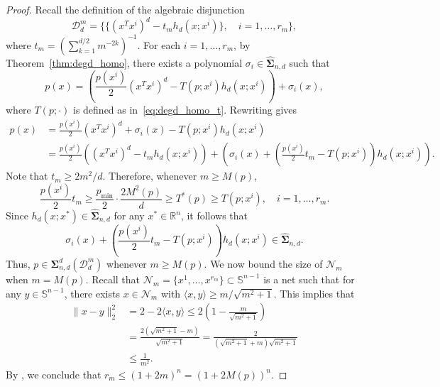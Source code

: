 \documentclass[12pt]{article}
\newcommand{\reals}{\mathbb{R}}
\newcommand{\HSOS}{\widehat{\mathbf{\Sigma}}}
\newcommand{\DiSOS}{\mathbf{\Sigma}}
\newcommand{\mcN}{\mathcal{N}}
\newcommand{\mbS}{\mathbb{S}}
\newcommand{\mcD}{\mathcal{D}}
\theoremstyle{remark}
\begin{document}
\begin{proof}
Recall the definition of the algebraic disjunction
\[
 \mcD_d^{m}=\big\{\{(x^Tx^i)^{d}-t_mh_{d}(x;x^i)\},\quad i=1,\ldots,r_m\big\},   
\]
where $t_m=\left(\sum_{k=1}^{d/2}m^{-2k}\right)^{-1}$. For each $i=1,\ldots,r_m$, by Theorem~\ref{thm:degd_homo}, there exists a polynomial $\sigma_i\in\HSOS_{n,d}$ such that
 \[    p(x)=\left(\frac{p(x^i)}{2}(x^Tx^i)^d-T(p;x^i)h_d(x;x^i)\right)+\sigma_i(x),\]
 where $T(p;\cdot)$ is defined as in~\eqref{eq:degd_homo_t}. 
Rewriting gives
  \[\begin{aligned}    
  p(x)&=\frac{p(x^i)}{2}(x^Tx^i)^d+\sigma_i(x)-T(p;x^i)h_d(x;x^i)\\
  &=\frac{p(x^i)}{2}\left((x^Tx^i)^d-t_mh_d(x;x^i)\right)+\left(\sigma_i(x)+\left(\frac{p(x^i)}{2}t_m-T(p;x^i)\right)h_d(x;x^i)\right).
  \end{aligned}\]
   Note that $t_m\ge 2m^2/d$. Therefore, whenever $m\ge M(p)$,
  \[\frac{p(x^i)}{2}t_m\ge \frac{p_{\min}}{2}\cdot\frac{2M^2(p)}{d}\ge T^*(p)\ge T(p;x^i),\quad i=1,\ldots,r_m.\]
 Since $h_d(x;x^*)\in\HSOS_{n,d}$ for any $x^*\in\reals^n$, it follows that
 \[\sigma_i(x)+\left(\frac{p(x^i)}{2}t_m-T(p;x^i)\right)h_d(x;x^i)\in\HSOS_{n,d}.\]
 Thus, $p\in\DiSOS_{n,d}^d(\mcD_d^m)$ whenever $m\ge M(p)$. We now bound the size of $\mcN_m$ when $m=M(p)$. Recall that $\mcN_m=\{x^1,\ldots,x^{r_m}\}\subset\mbS^{n-1}$ is a net such that for any $y\in \mbS^{n-1}$, there exists $x\in \mcN_m$ with $\langle x,y\rangle\ge m/\sqrt{m^2+1}$. This implies that
 \[\begin{aligned}
\|x-y\|_2^2&=2-2\langle x,y\rangle\le 2\left(1-\frac{m}{\sqrt{m^2+1}}\right)\\
&= \frac{2(\sqrt{m^2+1}-m)}{\sqrt{m^2+1}}=\frac{2}{(\sqrt{m^2+1}+m)\sqrt{m^2+1}}\\
&\le \frac{1}{m^2}.
 \end{aligned}\]
By \cite[Corollary 4.2.11]{vershynin2018high}, we conclude that 
$r_m\le (1+2m)^n= (1+2M(p))^n$.
\end{proof}

\end{document}
